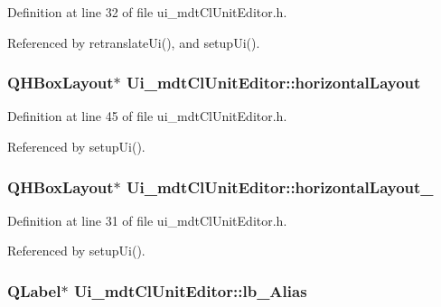 Definition at line 32 of file ui\-\_\-mdt\-Cl\-Unit\-Editor.\-h.



Referenced by retranslate\-Ui(), and setup\-Ui().

\hypertarget{class_ui__mdt_cl_unit_editor_ac8cb353d4ac12b2d4827822aabd2bbdc}{
\subsubsection[{horizontal\-Layout}]{\setlength{\rightskip}{0pt plus 5cm}Q\-H\-Box\-Layout$\ast$ Ui\-\_\-mdt\-Cl\-Unit\-Editor\-::horizontal\-Layout}}\label{class_ui__mdt_cl_unit_editor_ac8cb353d4ac12b2d4827822aabd2bbdc}


Definition at line 45 of file ui\-\_\-mdt\-Cl\-Unit\-Editor.\-h.



Referenced by setup\-Ui().

\hypertarget{class_ui__mdt_cl_unit_editor_a275b094c8e46dc0317b9c98e5a8d8477}{
\subsubsection[{horizontal\-Layout\-\_\-2}]{\setlength{\rightskip}{0pt plus 5cm}Q\-H\-Box\-Layout$\ast$ Ui\-\_\-mdt\-Cl\-Unit\-Editor\-::horizontal\-Layout\-\_}}\label{class_ui__mdt_cl_unit_editor_a275b094c8e46dc0317b9c98e5a8d8477}


Definition at line 31 of file ui\-\_\-mdt\-Cl\-Unit\-Editor.\-h.



Referenced by setup\-Ui().

\hypertarget{class_ui__mdt_cl_unit_editor_a1288c359f8ba4d0f09cf7686260feda7}{
\subsubsection[{lb\-\_\-\-Alias}]{\setlength{\rightskip}{0pt plus 5cm}Q\-Label$\ast$ Ui\-\_\-mdt\-Cl\-Unit\-Editor\-::lb\-\_\-\-Alias}}\label{class_ui__mdt_cl_unit_editor_a1288c359f8ba4d0f09cf7686260feda7}


